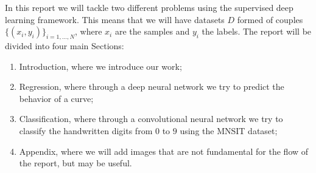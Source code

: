In this report we will tackle two different problems using the supervised deep learning framework. This means that we will
have datasets $D$ formed of couples $\{(x_i,y_i)\}_{i=1,\dots,N}$, where $x_i$ are the samples and $y_i$ the labels.
The report will be divided into four main Sections:
\begin{enumerate}
    \item Introduction, where we introduce our work;
    \item Regression, where through a deep neural network we try to predict the behavior of a curve;
    \item Classification, where through a convolutional neural network we try to classify the handwritten digits from $0$ to $9$ using
        the MNSIT dataset;
    \item Appendix, where we will add images that are not fundamental for the flow of the report, but may be useful.
\end{enumerate}